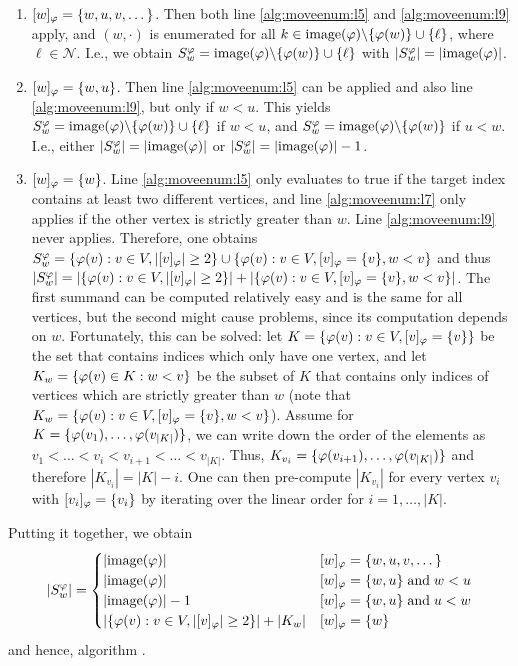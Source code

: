 \begin{enumerate}
    \item $[w]_\varphi = \{ w,u,v,\dots \}$. Then both line \ref{alg:moveenum:l5} and \ref{alg:moveenum:l9} apply, and $(w,\cdot)$ is enumerated for all $k \in \mathrm{image}(\varphi)\backslash\{\varphi(w)\} \cup \{ \ell \}$, where $\ell \in \mathcal{N}$. I.e., we obtain $S^\varphi_w = \mathrm{image}(\varphi)\backslash\{\varphi(w)\} \cup \{ \ell \}$ with $|S^\varphi_w| =|\mathrm{image}(\varphi)|$.
    \item $[w]_\varphi = \{ w,u \}$. Then line \ref{alg:moveenum:l5} can be applied and also line \ref{alg:moveenum:l9}, but only if $w < u$. This yields $S^\varphi_w = \mathrm{image}(\varphi)\backslash \{ \varphi(w)\} \cup \{ \ell \}$ if $w < u$, and $S^\varphi_w = \mathrm{image}(\varphi)\backslash \{ \varphi(w) \}$ if $u<w$. I.e., either $|S^\varphi_w| =|\mathrm{image}(\varphi)|$ or $|S^\varphi_w| =|\mathrm{image}(\varphi)|-1$.
    \item $[w]_\varphi = \{ w \}$. Line \ref{alg:moveenum:l5} only evaluates to true if the target index contains at least two different vertices, and line \ref{alg:moveenum:l7} only applies if the other vertex is strictly greater than $w$. Line \ref{alg:moveenum:l9} never applies. Therefore, one obtains $S^\varphi_w = \{ \varphi(v) : v\in V, |[v]_\varphi| \geq 2 \} \cup \{ \varphi(v) : v\in V, [v]_\varphi = \{ v \}, w < v \}$ and thus $|S^\varphi_w| = |\{ \varphi(v) : v\in V, |[v]_\varphi| \geq 2 \}|+|\{ \varphi(v) : v\in V, [v]_\varphi = \{ v \}, w < v \}|$. The first summand can be computed relatively easy and is the same for all vertices, but the second might cause problems, since its computation depends on $w$. Fortunately, this can be solved: let $K = \{ \varphi(v) : v\in V, [v]_\varphi = \{ v \}\}$ be the set that contains indices which only have one vertex, and let $K_w = \{ \varphi(v) \in K : w < v \}$ be the subset of $K$ that contains only indices of vertices which are strictly greater than $w$ (note that $K_w = \{ \varphi(v) : v\in V, [v]_\varphi = \{ v \}, w < v \}$). Assume for $K = \{ \varphi(v_1),\dots,\varphi(v_{|K|}) \}$, we can write down the order of the elements as $ v_1 < \dots < v_i < v_{i+1} < \dots < v_{|K|} $. Thus, $K_{v_i} = \{ \varphi(v_{i+1}),\dots,\varphi(v_{|K|})\}$ and therefore $|K_{v_i}| = |K| - i$. One can then pre-compute $|K_{v_i}|$ for every vertex $v_i$ with $[v_i]_\varphi = \{v_i\}$ by iterating over the linear order for $i=1,\dots,|K|$.
\end{enumerate}
Putting it together, we obtain 
\begin{align}
    |S^\varphi_w| = \begin{cases}
        |\mathrm{image}(\varphi)| & [w]_\varphi = \{ w,u,v,\dots \} \\
        |\mathrm{image}(\varphi)| & [w]_\varphi = \{w,u\} \;\text{and}\; w < u \\ 
        |\mathrm{image}(\varphi)|-1 & [w]_\varphi = \{w,u\} \;\text{and}\; u < w \\
        |\{ \varphi(v) : v\in V, |[v]_\varphi| \geq 2 \}| +|K_w| & [w]_\varphi = \{w\}
    \end{cases} \label{eq:S_w}
\end{align}
and hence, algorithm \emph{}.

